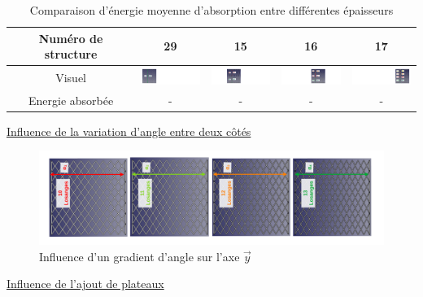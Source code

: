 \documentclass[a4paper]{article}
\begin{document}
	\begin{table}[H]
		\centering
		\begin{tabular}{|c|c|c|c|c|}
			\hline
			\rowcolor{Gray}
			Numéro de structure & 29 & 15 & 16 & 17\\
			\hline\hline
			Visuel &
			\includegraphics[width=2cm]{Images/7/1.pdf} &
			\includegraphics[width=2cm]{Images/7/15.pdf} &
			\includegraphics[width=2cm]{Images/7/16.pdf} &
			\includegraphics[width=2cm]{Images/7/17.pdf}\\
			\hline
			Energie absorbée & - & - & - & - \\
			\hline
		\end{tabular}
		\caption{Comparaison d'énergie moyenne d'absorption entre différentes épaisseurs}
	\end{table}
	
	\underline{Influence de la variation d'angle entre deux côtés}\\
	
	\begin{figure}[H]
		\centering
		\includegraphics[width=14cm, angle=-90]{Images/7/gradient_y.pdf}
		\caption{Influence d'un gradient d'angle sur l'axe $\vec{y}$}
	\end{figure}
	
	\underline{Influence de l'ajout de plateaux}\\
	
\end{document}
